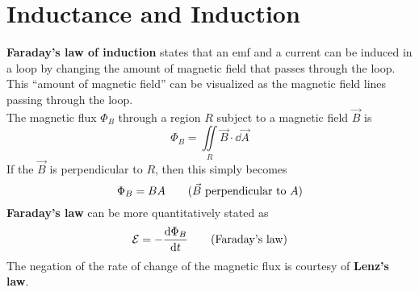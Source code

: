\documentclass{subfiles}
\begin{document}
	\section{Inductance and Induction}
		\textbf{Faraday's law of induction} states that an emf and a current can be induced in a loop by changing the amount of magnetic field that passes through the loop. This \enquote{amount of magnetic field} can be visualized as the magnetic field lines passing through the loop. \\
		The magnetic flux \(\Phi_B\) through a region \(R\) subject to a magnetic field \(\vec{B}\) is
			\[\Phi_B = \iint\limits_R \vec{B} \cdot \dd{\vec{A}} \tag{magnetic flux}\]
			If the \(\vec{B}\) is perpendicular to \(R\), then this simply becomes
				\[\Phi_B = BA \tag{\(\vec{B}\) perpendicular to \(A\)}\]
		\textbf{Faraday's law} can be more quantitatively stated as
			\[\mathcal{E} = -\dv{\Phi_B}{t} \tag{Faraday's law}\]
			The negation of the rate of change of the magnetic flux is courtesy of \textbf{Lenz's law}.
			
\end{document}
